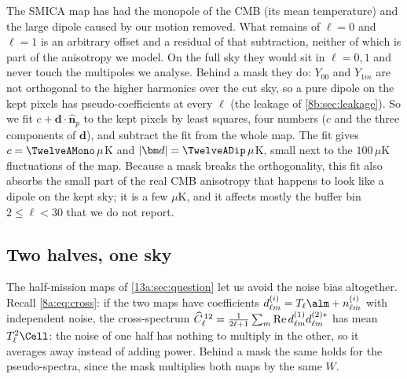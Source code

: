 The SMICA map has had the monopole of the CMB (its mean temperature) and the large dipole caused by our motion
removed. What remains of $\ell=0$ and $\ell=1$ is an arbitrary offset and a residual of that subtraction,
neither of which is part of the anisotropy we model. On the full sky they would sit in $\ell=0,1$ and
never touch the multipoles we analyse. Behind a mask they do: $Y_{00}$ and $Y_{1m}$ are not orthogonal to
the higher harmonics over the cut sky, so a pure dipole on the kept pixels has pseudo-coefficients at every
$\ell$ (the leakage of \cref{8b:sec:leakage}). So we fit $c+\bm d\cdot\hat{\bm n}_p$ to the kept pixels
by least squares, four numbers ($c$ and the three components of $\bm d$), and subtract the fit from the whole map.
The fit gives $c=\TwelveAMono\,\mu$K and $|\bm d|=\TwelveADip\,\mu$K, small next to the $100\,\mu$K
fluctuations of the map. Because a mask breaks the orthogonality, this fit also absorbs the small part of the
real CMB anisotropy that happens to look like a dipole on the kept sky; it is a few $\mu$K, and it affects
mostly the buffer bin $2\le\ell<30$ that we do not report.

\subsection{Two halves, one sky}
\label{13a:sec:cross}

The half-mission maps of \cref{13a:sec:question} let us avoid the noise bias altogether. Recall
\eqref{8a:eq:cross}: if the two maps have coefficients $d^{(i)}_{\ell m}=T_\ell\alm+n^{(i)}_{\ell m}$ with
independent noise, the cross-spectrum
$\widehat C^{\,12}_\ell=\frac1{2\ell+1}\sum_m{\rm Re}\,d^{(1)}_{\ell m}d^{(2)*}_{\ell m}$ has mean $T_\ell^2\Cell$:
the noise of one half has nothing to multiply in the other, so it averages away instead of adding power.
Behind a mask the same holds for the pseudo-spectra, since the mask multiplies both maps by the same $W$.

